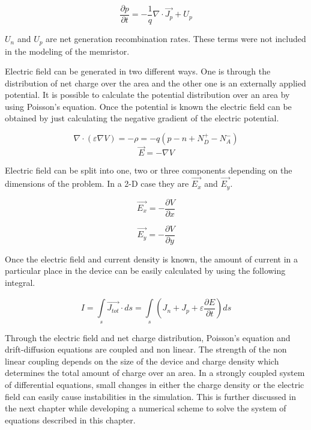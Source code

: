 \begin{doublespace}
\begin{equation}
\frac{\partial p}{\partial t}=-\frac{1}{q}\nabla \cdot \vec{J_p}+U_{p}
\label{conp}
\end{equation}

$U_{n}$ and $U_{p}$ are net generation recombination rates. These terms were not included in the modeling of the memristor. 

Electric field can be generated in two different ways. One is through the distribution of net charge over the area and the other one is an externally applied potential. It is possible to calculate the potential distribution over an area by using Poisson's equation. Once the potential is known the electric field can be obtained by just calculating the negative gradient of the electric potential.

\begin{equation}
\nabla \cdot  (\varepsilon \nabla V)=-\rho=-q(p-n+N_{D}^{+}-N_{A}^{-})
\label{poisson}
\end{equation}
\begin{equation}
\vec{E}=-\nabla V
\label{Efield}
\end{equation}

Electric field can be split into one, two or three components depending on the dimensions of the problem. In a 2-D case they are $\vec{E_x}$ and $\vec{E_y}$.

\begin{equation}
\vec{E_x}=-\frac{\partial V}{\partial x}
\end{equation}

\begin{equation}
\vec{E_y}=-\frac{\partial V}{\partial y}
\end{equation}

Once the electric field and current density is known, the amount of current in a particular place in the device can be easily calculated by using the following integral.

\begin{equation}
I=\int\limits_{s}^{}\vec{J_{tot}} \cdot ds = \int\limits_{s}^{}(J_n+J_p+\varepsilon\frac{\partial E}{\partial t})ds
\end{equation}


Through the electric field and net charge distribution, Poisson's equation and drift-diffusion equations are coupled and non linear. The strength of the non linear coupling depends on the size of the device and charge density which determines the total amount of charge over an area. In a strongly coupled system of differential equations, small changes in either the charge density or the electric field can easily cause instabilities in the simulation. This is further discussed in the next chapter while developing a numerical scheme to solve the system of equations described in this chapter. 


\end{doublespace}
